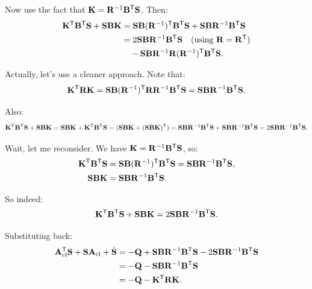 Now use the fact that $\mathbf{K} = \mathbf{R}^{-1}\mathbf{B}^{\mathsf{T}}\mathbf{S}$. Then:
\begin{align}
\mathbf{K}^{\mathsf{T}}\mathbf{B}^{\mathsf{T}}\mathbf{S} + \mathbf{S}\mathbf{B}\mathbf{K} &= \mathbf{S}\mathbf{B}(\mathbf{R}^{-1})^{\mathsf{T}}\mathbf{B}^{\mathsf{T}}\mathbf{S} + \mathbf{S}\mathbf{B}\mathbf{R}^{-1}\mathbf{B}^{\mathsf{T}}\mathbf{S} \notag\\
&= 2\mathbf{S}\mathbf{B}\mathbf{R}^{-1}\mathbf{B}^{\mathsf{T}}\mathbf{S} \quad \text{(using } \mathbf{R} = \mathbf{R}^{\mathsf{T}} \text{)} \\
&\quad - \mathbf{S}\mathbf{B}\mathbf{R}^{-1}\mathbf{R}(\mathbf{R}^{-1})^{\mathsf{T}}\mathbf{B}^{\mathsf{T}}\mathbf{S}.
\label{eq:ch6:trick}
\end{align}

Actually, let's use a cleaner approach. Note that:
\begin{equation}
\mathbf{K}^{\mathsf{T}}\mathbf{R}\mathbf{K} = \mathbf{S}\mathbf{B}(\mathbf{R}^{-1})^{\mathsf{T}}\mathbf{R}\mathbf{R}^{-1}\mathbf{B}^{\mathsf{T}}\mathbf{S}
                        = \mathbf{S}\mathbf{B}\mathbf{R}^{-1}\mathbf{B}^{\mathsf{T}}\mathbf{S}.
\label{eq:ch6:K-R-K}
\end{equation}

Also:
\begin{equation}
\mathbf{K}^{\mathsf{T}}\mathbf{B}^{\mathsf{T}}\mathbf{S} + \mathbf{S}\mathbf{B}\mathbf{K} = \mathbf{S}\mathbf{B}\mathbf{K} + \mathbf{K}^{\mathsf{T}}\mathbf{B}^{\mathsf{T}}\mathbf{S}
                                                    = (\mathbf{S}\mathbf{B}\mathbf{K} + (\mathbf{S}\mathbf{B}\mathbf{K})^{\mathsf{T}})
                                                    = \mathbf{S}\mathbf{B}\mathbf{R}^{-1}\mathbf{B}^{\mathsf{T}}\mathbf{S} + \mathbf{S}\mathbf{B}\mathbf{R}^{-1}\mathbf{B}^{\mathsf{T}}\mathbf{S}
                                                    = 2\mathbf{S}\mathbf{B}\mathbf{R}^{-1}\mathbf{B}^{\mathsf{T}}\mathbf{S}.
\label{eq:ch6:symmetric-form}
\end{equation}

Wait, let me reconsider. We have $\mathbf{K} = \mathbf{R}^{-1}\mathbf{B}^{\mathsf{T}}\mathbf{S}$, so:
\begin{align}
\mathbf{K}^{\mathsf{T}}\mathbf{B}^{\mathsf{T}}\mathbf{S} &= \mathbf{S}\mathbf{B}(\mathbf{R}^{-1})^{\mathsf{T}}\mathbf{B}^{\mathsf{T}}\mathbf{S} = \mathbf{S}\mathbf{B}\mathbf{R}^{-1}\mathbf{B}^{\mathsf{T}}\mathbf{S}, \\
\mathbf{S}\mathbf{B}\mathbf{K} &= \mathbf{S}\mathbf{B}\mathbf{R}^{-1}\mathbf{B}^{\mathsf{T}}\mathbf{S}.
\end{align}

So indeed:
\begin{equation}
\mathbf{K}^{\mathsf{T}}\mathbf{B}^{\mathsf{T}}\mathbf{S} + \mathbf{S}\mathbf{B}\mathbf{K} = 2\mathbf{S}\mathbf{B}\mathbf{R}^{-1}\mathbf{B}^{\mathsf{T}}\mathbf{S}.
\label{eq:ch6:key-sum}
\end{equation}

Substituting back:
\begin{align}
\mathbf{A}_{\text{cl}}^{\mathsf{T}}\mathbf{S} + \mathbf{S}\mathbf{A}_{\text{cl}} + \dot{\mathbf{S}}
&= -\mathbf{Q} + \mathbf{S}\mathbf{B}\mathbf{R}^{-1}\mathbf{B}^{\mathsf{T}}\mathbf{S} - 2\mathbf{S}\mathbf{B}\mathbf{R}^{-1}\mathbf{B}^{\mathsf{T}}\mathbf{S} \notag\\
&= -\mathbf{Q} - \mathbf{S}\mathbf{B}\mathbf{R}^{-1}\mathbf{B}^{\mathsf{T}}\mathbf{S} \notag\\
&= -\mathbf{Q} - \mathbf{K}^{\mathsf{T}}\mathbf{R}\mathbf{K}.
\label{eq:ch6:final-identity}
\end{align}

